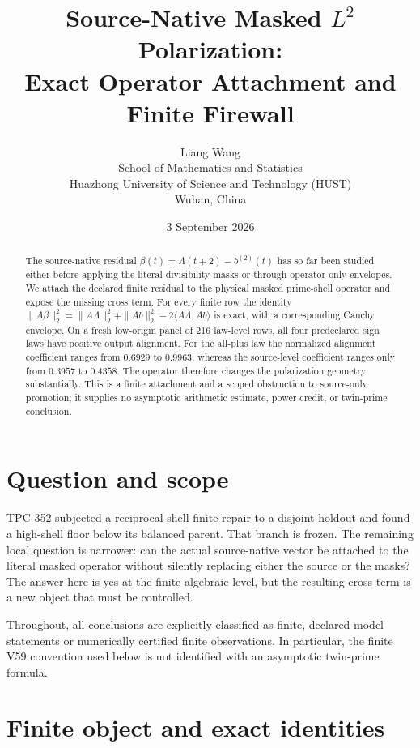 \documentclass[10pt]{article}
\title{Source-Native Masked $L^2$ Polarization:\\
Exact Operator Attachment and Finite Firewall}
\author{Liang Wang\\
School of Mathematics and Statistics\\
Huazhong University of Science and Technology (HUST)\\
Wuhan, China}
\date{3 September 2026}
\begin{document}
\maketitle

\begin{abstract}
The source-native residual $\beta(t)=\Lambda(t+2)-b^{(2)}(t)$ has so far
been studied either before applying the literal divisibility masks or through
operator-only envelopes.  We attach the declared finite residual to the
physical masked prime-shell operator and expose the missing cross term.  For
every finite row the identity
$\|A\beta\|_2^2=\|A\Lambda\|_2^2+\|Ab\|_2^2-2\langle A\Lambda,Ab\rangle$
is exact, with a corresponding Cauchy envelope.  On a fresh low-origin panel
of 216 law-level rows, all four predeclared sign laws have positive output
alignment.  For the all-plus law the normalized alignment coefficient ranges
from $0.6929$ to $0.9963$, whereas the source-level coefficient ranges only
from $0.3957$ to $0.4358$.  The operator therefore changes the polarization
geometry substantially.  This is a finite attachment and a scoped obstruction
to source-only promotion; it supplies no asymptotic arithmetic estimate,
power credit, or twin-prime conclusion.
\end{abstract}

\section{Question and scope}

TPC-352 subjected a reciprocal-shell finite repair to a disjoint holdout and
found a high-shell floor below its balanced parent.  That branch is frozen.
The remaining local question is narrower: can the actual source-native vector
be attached to the literal masked operator without silently replacing either
the source or the masks?  The answer here is yes at the finite algebraic
level, but the resulting cross term is a new object that must be controlled.

Throughout, all conclusions are explicitly classified as finite, declared
model statements or numerically certified finite observations.  In particular,
the finite V59 convention used below is not identified with an asymptotic
twin-prime formula.

\section{Finite object and exact identities}
\end{document}

